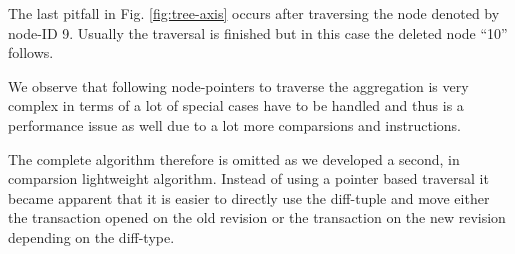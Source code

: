 
%

The last pitfall in Fig. \ref{fig:tree-axis} occurs after traversing the node denoted by node-ID 9. Usually the traversal is finished but in this case the deleted node ``10'' follows.

We observe that following node-pointers to traverse the aggregation is very complex in terms of a lot of special cases have to be handled and thus is a performance issue as well due to a lot more comparsions and instructions.

The complete algorithm therefore is omitted as we developed a second, in comparsion lightweight algorithm. Instead of using a pointer based traversal it became apparent that it is easier to directly use the diff-tuple and move either the transaction opened on the old revision or the transaction on the new revision depending on the diff-type.

